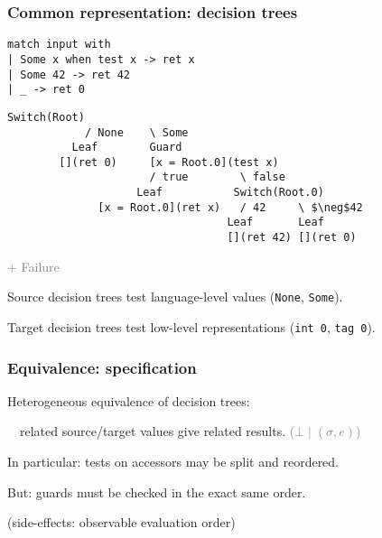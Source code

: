 \documentclass[dvipsnames,aspectratio=169]{beamer}
\begin{document}
\begin{frame}[fragile]
  \frametitle{Common representation: decision trees}
\begin{lstlisting}
match input with
| Some x when test x -> ret x
| Some 42 -> ret 42
| _ -> ret 0
\end{lstlisting}

\vfill\pause

\begin{lstlisting}[columns=fixed]
            Switch(Root)
            / None    \ Some
          Leaf        Guard
        [](ret 0)     [x = Root.0](test x)
                      / true        \ false
                    Leaf           Switch(Root.0)
              [x = Root.0](ret x)   / 42     \ $\neg$42
                                  Leaf       Leaf
                                  [](ret 42) [](ret 0)
\end{lstlisting}
\hfill\textcolor{gray}{+ Failure}

\vfill\pause

Source decision trees test language-level values (\texttt{None}, \texttt{Some}).

Target decision trees test low-level representations (\texttt{int 0}, \texttt{tag 0}).

\end{frame}

\begin{frame}
  \frametitle{Equivalence: specification}

  Heterogeneous equivalence of decision trees:

  $\quad$related source/target values give related results.
  \textcolor{gray}{($\bot \mid (\sigma, e)$)}

  \vfill

  In particular: tests on accessors may be split and reordered.

  \vfill

  But: guards must be checked in the exact same order.

  (side-effects: observable evaluation order)
\end{frame}
\end{document}

